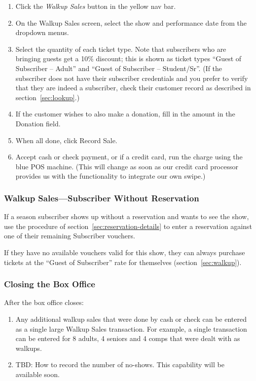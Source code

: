 \begin{enumerate}
\item Click the \emph{Walkup Sales} button in the yellow nav bar.
\item On the Walkup Sales screen, select the show and performance date
  from the dropdown menus.
\item Select the quantity of each ticket type. Note that subscribers who
  are bringing guests get a 10\% discount; this is shown as ticket types
  ``Guest of Subscriber -- Adult'' and ``Guest of Subscriber --
  Student/Sr''.  (If the subscriber does not have their subscriber
  credentials  and you prefer to verify that they are
  indeed a subscriber, check their customer record as described in
  section~\ref{sec:lookup}.)
\item If the customer wishes to also make a donation, fill in the amount
  in the Donation field.
\item When all done, click Record Sale.
\item Accept cash or check payment, or if a credit card, run the charge
  using the blue POS machine.  (This will change as soon as our credit
  card processor provides us with the functionality to integrate our own
  swipe.) 
\end{enumerate}

\subsubsection{Walkup Sales---Subscriber Without Reservation}
\label{sec:walkupsubscriber}

If a season subscriber shows up without a reservation and wants to see
the show, use the procedure of section~\ref{sec:reservation-details} to 
enter a reservation against one of their remaining Subscriber vouchers.

If they have no available vouchers valid for this show, they can always
purchase tickets at the ``Guest of Subscriber'' rate for themselves
(section~\ref{sec:walkup}). 


\subsubsection{Closing the Box Office}

After the box office closes:

\begin{enumerate}
\item Any additional walkup sales that were done by cash or check can be
  entered as a single large Walkup Sales transaction.  For example, a
  single transaction can be entered for 8 adults, 4 seniors and 4 comps
  that were dealt with as walkups.
\item TBD:  How to record the number of no-shows.  This capability will
  be available soon.
\end{enumerate}
